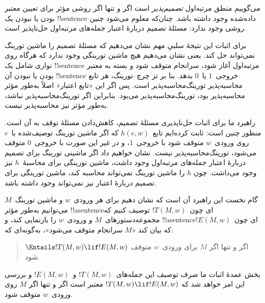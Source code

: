 \documentclass[../../../include/open-logic-section]{subfiles}
\begin{document}

می‌گوییم منطق مرتبه‌اول \emph{تصمیم‌پذیر} است اگر و تنها اگر روشی
مؤثر برای تعیین معتبر بودن یا نبودن یک !!{sentence}ٔ داده‌شده وجود داشته
باشد. چنان‌که معلوم می‌شود چنین روشی وجود ندارد: مسئلهٔ تصمیم دربارهٔ
اعتبار جمله‌های مرتبه‌اول حل‌ناپذیر است.

برای اثبات این نتیجهٔ سلبیِ مهم نشان می‌دهیم که مسئلهٔ تصمیم را ماشین
تورینگ نمی‌تواند حل کند. یعنی نشان می‌دهیم هیچ ماشین تورینگی وجود
ندارد که هرگاه روی نواری شامل یک !!{sentence}ٔ مرتبه‌اول آغاز شود، سرانجام
متوقف شود و بسته به معتبر بودن یا نبودن آن !!{sentence} خروجی~$1$ یا~$0$
بدهد. بنا بر تز چرچ--تورینگ، هر تابع محاسبه‌پذیر
تورینگ‌محاسبه‌پذیر است. پس اگر این «تابع اعتبار» اصلاً به‌طور مؤثر
محاسبه‌پذیر بود، تورینگ‌محاسبه‌پذیر می‌بود. بنابراین اگر
تورینگ‌محاسبه‌پذیر نباشد، به‌طور مؤثر نیز محاسبه‌پذیر نیست.

راهبرد ما برای اثبات حل‌ناپذیری مسئلهٔ تصمیم، کاهش‌دادن مسئلهٔ توقف
به آن است. منظور چنین است: ثابت کرده‌ایم تابع~$h(e,w)$ که اگر ماشین
تورینگ توصیف‌شده با~$e$ روی ورودی~$w$ متوقف شود با خروجی~$1$، و در
غیر این صورت با خروجی~$0$ متوقف می‌شود، تورینگ‌محاسبه‌پذیر نیست.
نشان خواهیم داد اگر ماشینی تورینگ برای تصمیم دربارهٔ اعتبار جمله‌های
مرتبه‌اول وجود داشت، ماشین تورینگی برای محاسبهٔ~$h$ نیز وجود می‌داشت.
چون $h$ را ماشین تورینگ نمی‌تواند محاسبه کند، ماشین تورینگی برای
تصمیم دربارهٔ اعتبار نیز نمی‌تواند وجود داشته باشد.

گام نخست این راهبرد آن است که نشان دهیم برای هر ورودی~$w$ و ماشین
تورینگ~$M$ می‌توانیم به‌طور مؤثر !!a{sentence}ای چون~$!T(M,w)$ توصیف کنیم
که مجموعه‌دستورهای~$M$ و ورودی~$w$ را بازنمایی کند، و !!a{sentence}ای
چون~$!E(M,w)$ که بیان کند «$M$ سرانجام متوقف می‌شود»، به‌گونه‌ای که:
\begin{quote}
  $\Entails !T(M,w)\lif !E(M,w)$ اگر و تنها اگر $M$ برای ورودی~$w$
  متوقف شود.
\end{quote}
بخش عمدهٔ اثبات ما صرف توصیف این جمله‌های~$!T(M,w)$ و~$!E(M,w)$ و
بررسی این امر خواهد شد که $!T(M,w)\lif !E(M,w)$ معتبر است اگر و تنها
اگر $M$ روی ورودی~$w$ متوقف شود.
\end{document}
